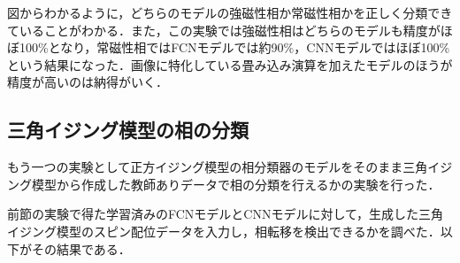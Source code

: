 \documentclass[a4paper,11pt]{jsreport}
\begin{document}
図からわかるように，どちらのモデルの強磁性相か常磁性相かを正しく分類できていることがわかる．また，この実験では強磁性相はどちらのモデルも精度がほぼ100\%となり，常磁性相ではFCNモデルでは約90\%，CNNモデルではほぼ100\%という結果になった．画像に特化している畳み込み演算を加えたモデルのほうが精度が高いのは納得がいく．


\subsection{三角イジング模型の相の分類}
もう一つの実験として正方イジング模型の相分類器のモデルをそのまま三角イジング模型から作成した教師ありデータで相の分類を行えるかの実験を行った．\par
前節の実験で得た学習済みのFCNモデルとCNNモデルに対して，生成した三角イジング模型のスピン配位データを入力し，相転移を検出できるかを調べた．以下がその結果である．\par
\end{document}
